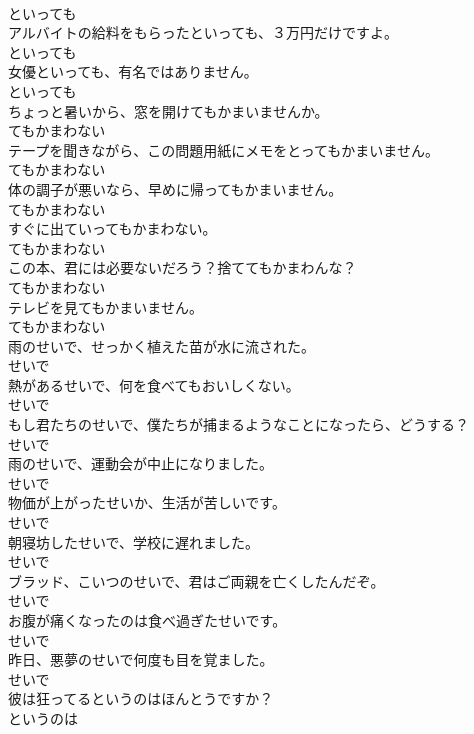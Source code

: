 \documentclass[8pt]{extreport}
\begin{document}
\begin{CJK}{UTF8}{min}
\\	といっても	
\\	アルバイトの給料をもらったといっても、３万円だけですよ。	
\\	といっても	
\\	女優といっても、有名ではありません。	
\\	といっても	
\\	ちょっと暑いから、窓を開けてもかまいませんか。	
\\	てもかまわない	
\\	テープを聞きながら、この問題用紙にメモをとってもかまいません。	
\\	てもかまわない	
\\	体の調子が悪いなら、早めに帰ってもかまいません。	
\\	てもかまわない	
\\	すぐに出ていってもかまわない。	
\\	てもかまわない	
\\	この本、君には必要ないだろう？捨ててもかまわんな？	
\\	てもかまわない	
\\	テレビを見てもかまいません。	
\\	てもかまわない	
\\	雨のせいで、せっかく植えた苗が水に流された。	
\\	せいで	
\\	熱があるせいで、何を食べてもおいしくない。	
\\	せいで	
\\	もし君たちのせいで、僕たちが捕まるようなことになったら、どうする？	
\\	せいで	
\\	雨のせいで、運動会が中止になりました。	
\\	せいで	
\\	物価が上がったせいか、生活が苦しいです。	
\\	せいで	
\\	朝寝坊したせいで、学校に遅れました。	
\\	せいで	
\\	ブラッド、こいつのせいで、君はご両親を亡くしたんだぞ。	
\\	せいで	
\\	お腹が痛くなったのは食べ過ぎたせいです。	
\\	せいで	
\\	昨日、悪夢のせいで何度も目を覚ました。	
\\	せいで	
\\	彼は狂ってるというのはほんとうですか？	
\\	というのは	

\end{CJK}
\end{document}
